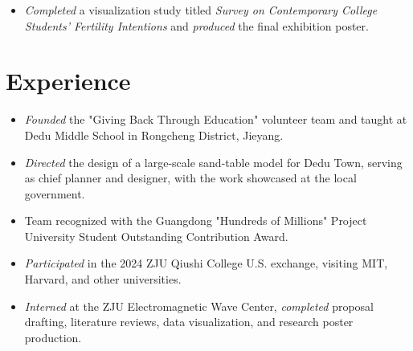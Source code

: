 \documentclass{resume}
\begin{document}
\begin{itemize}[parsep=0.5ex]
  \item \textit{Completed} a visualization study titled \textit{Survey on Contemporary College Students' Fertility Intentions} and \textit{produced} the final exhibition poster.
\end{itemize}

\section{Experience}

\begin{itemize}[parsep=0.5ex]
 \item \textit{Founded} the "Giving Back Through Education" volunteer team and taught at Dedu Middle School in Rongcheng District, Jieyang.
 \item \textit{Directed} the design of a large-scale sand-table model for Dedu Town, serving as chief planner and designer, with the work showcased at the local government.
 \item Team recognized with the Guangdong "Hundreds of Millions" Project University Student Outstanding Contribution Award.
\end{itemize}


\begin{itemize}[parsep=0.5ex]
\item \textit{Participated} in the 2024 ZJU Qiushi College U.S. exchange, visiting MIT, Harvard, and other universities.
\end{itemize}

\begin{itemize}[parsep=0.5ex]
  \item \textit{Interned} at the ZJU Electromagnetic Wave Center, \textit{completed} proposal drafting, literature reviews, data visualization, and research poster production.
\end{itemize}
\end{document}
